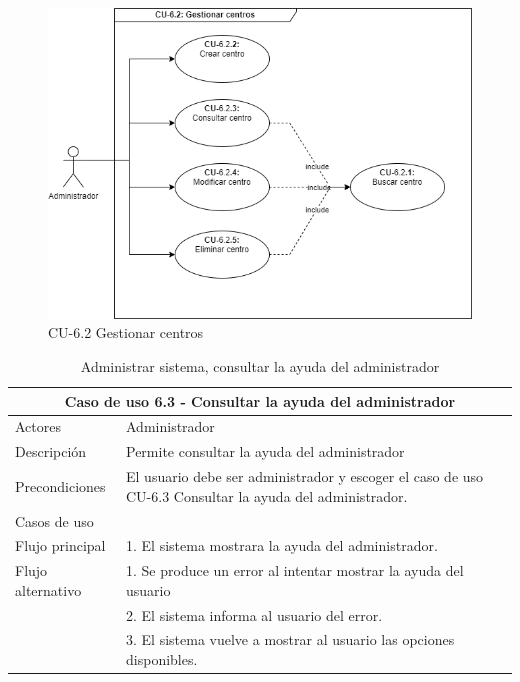 \begin{figure}[H]
        \centering
        \includegraphics[scale=0.55]{img/diagramas/Funcional/CU-6.2.png}
        \caption{CU-6.2 Gestionar centros}
        \label{fig:Diagrama-Caso de uso 6.2 Gestionar centros}
\end{figure}


\begin{table}[H]
    \caption{Administrar sistema, consultar la ayuda del administrador}
    \label{tab:CU-6.3}
    \begin{center}
        \begin{tabular}{|l|p{12cm}|}
            \hline
            \multicolumn{2}{|c|}{Caso de uso 6.3 - Consultar la ayuda del administrador} \\ \hline \hline

            Actores                 &   Administrador   \\  \hline
            Descripción             &   Permite consultar la ayuda del administrador \\  \hline
            Precondiciones          &   El usuario debe ser administrador y escoger el caso de uso CU-6.3 Consultar la ayuda del administrador.         \\  \hline
            Casos de uso            &   
                                                   \\  \hline
            Flujo principal         &   1. El sistema mostrara la ayuda del administrador.        \\ \hline
            Flujo alternativo    &   1. Se produce un error al intentar mostrar la ayuda del usuario \\ & 2. El sistema informa al usuario del error. \\ & 3. El sistema vuelve a mostrar al usuario las opciones disponibles.   \\  \hline
            
        \end{tabular}
    \end{center}
\end{table}


